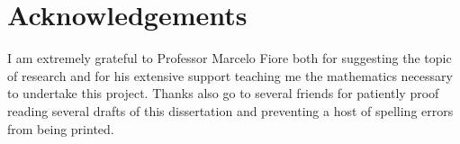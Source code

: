 \chapter*{\centering Acknowledgements}
\afterpage{\blankpage}
\setcounter{page}{1}
I am extremely grateful to Professor Marcelo Fiore both for suggesting the topic
of research and for his extensive support teaching me the mathematics necessary
to undertake this project. Thanks also go to several friends for patiently proof
reading several drafts of this dissertation and preventing a host of spelling
errors from being printed.